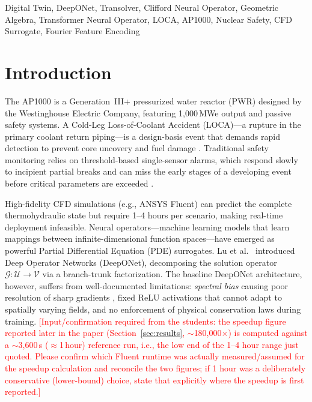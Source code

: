 \documentclass[journal]{IEEEtran}
\begin{document}
\begin{IEEEkeywords}
Digital Twin, DeepONet, Transolver, Clifford Neural Operator, Geometric Algebra, Transformer Neural Operator, LOCA, AP1000, Nuclear Safety, CFD Surrogate, Fourier Feature Encoding
\end{IEEEkeywords}

\section{Introduction}

The AP1000 is a Generation~III+ pressurized water reactor (PWR) designed by the Westinghouse Electric Company, featuring 1,000\,MWe output and passive safety systems. A Cold-Leg Loss-of-Coolant Accident (LOCA)---a rupture in the primary coolant return piping---is a design-basis event that demands rapid detection to prevent core uncovery and fuel damage \cite{wecdcd}. Traditional safety monitoring relies on threshold-based single-sensor alarms, which respond slowly to incipient partial breaks and can miss the early stages of a developing event before critical parameters are exceeded \cite{nrc_loca}.

High-fidelity CFD simulations (e.g., ANSYS Fluent) can predict the complete thermohydraulic state but require 1--4 hours per scenario, making real-time deployment infeasible. Neural operators---machine learning models that learn mappings between infinite-dimensional function spaces---have emerged as powerful Partial Differential Equation (PDE) surrogates. Lu et al.~\cite{lu2021deeponet} introduced Deep Operator Networks (DeepONet), decomposing the solution operator $\mathcal{G}: \mathcal{U} \to \mathcal{V}$ via a branch-trunk factorization. The baseline DeepONet architecture, however, suffers from well-documented limitations: \emph{spectral bias} causing poor resolution of sharp gradients \cite{rahaman2019spectral}, fixed ReLU activations that cannot adapt to spatially varying fields, and no enforcement of physical conservation laws during training. \textcolor{red}{[Input/confirmation required from the students: the speedup figure reported later in the paper (Section~\ref{sec:results}, $\sim$180,000$\times$) is computed against a $\sim$3,600\,s ($\approx$1\,hour) reference run, i.e., the low end of the 1--4 hour range just quoted. Please confirm which Fluent runtime was actually measured/assumed for the speedup calculation and reconcile the two figures; if 1 hour was a deliberately conservative (lower-bound) choice, state that explicitly where the speedup is first reported.]}
\end{document}

